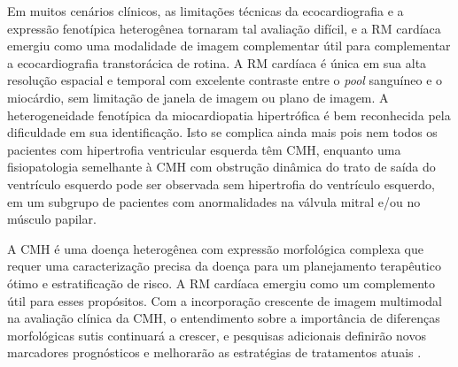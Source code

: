 Em muitos cenários clínicos, as limitações técnicas da ecocardiografia e a expressão fenotípica heterogênea tornaram tal avaliação difícil, e a \gls{RM} cardíaca emergiu como uma modalidade de imagem complementar útil para complementar a ecocardiografia transtorácica de rotina. A \gls{RM} cardíaca é única em sua alta resolução espacial e temporal com excelente contraste entre o \textit{pool} sanguíneo e o miocárdio, sem limitação de janela de imagem ou plano de imagem.
A heterogeneidade fenotípica da miocardiopatia hipertrófica é bem reconhecida pela dificuldade em sua identificação. Isto se complica ainda mais pois nem todos os pacientes com hipertrofia ventricular esquerda têm CMH, enquanto uma fisiopatologia semelhante à CMH com obstrução dinâmica do trato de saída do ventrículo esquerdo pode ser observada sem hipertrofia do ventrículo esquerdo, em um subgrupo de pacientes com anormalidades na válvula mitral e/ou no músculo papilar.

A CMH é uma doença heterogênea com expressão morfológica complexa que requer uma caracterização precisa da doença para um planejamento terapêutico ótimo e estratificação de risco. A \gls{RM} cardíaca emergiu como um complemento útil para esses propósitos. Com a incorporação crescente de imagem multimodal na avaliação clínica da CMH, o entendimento sobre a importância de diferenças morfológicas sutis continuará a crescer, e pesquisas adicionais definirão novos marcadores prognósticos e melhorarão as estratégias de tratamentos atuais \cite{toCardiacMagneticResonance2011c}.






